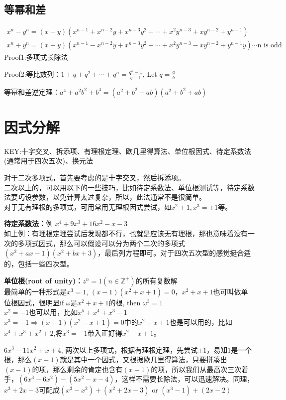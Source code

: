\documentclass[../main.tex]{subfiles}
\begin{document}
\subsection{等幂和差}
\begin{gather*}
  x^n-y^n=(x-y)(x^{n-1}+x^{n-2}y+x^{n-3}y^2+\cdots + x^2y^{n-3}+xy^{n-2}+y^{n-1})\\
  x^n+y^n=(x+y)(x^{n-1}-x^{n-2}y+x^{n-3}y^2-\cdots +x^2y^{n-3}-xy^{n-2}+y^{n-1}y) \cdots \text{n is odd}
\end{gather*}
Proof1:多项式长除法

Proof2:等比数列：$1+q+q^2+\cdots +q^n=\frac{q^{n}-1}{q-1}$, Let $q=\frac{a}{b}$

等幂和差逆定理：$a^4+a^2b^2+b^4=(a^2+b^2-ab)(a^2+b^2+ab)$

\section{因式分解}
KEY:十字交叉、拆添项、有理根定理、欧几里得算法、单位根因式、待定系数法(通常用于四次五次)、换元法

对于二次多项式，首先要考虑的是十字交叉，然后拆添项。\\
二次以上的，可以用以下的一些技巧，比如待定系数法、单位根测试等，待定系数法要巧设参数，以免计算太过复杂，所以，此法通常不是很简单。\\
对于无有理根的多项式，可用常用无理根因式尝试，如$x^2+1, x^3=\pm 1$等。

\textbf{待定系数法：}例 $x^4+9x^3+16x^2-x-3$\\
如上例：有理根定理尝试后发现都不行，也就是应该无有理根，那也意味着没有一次的多项式因式，那么可以假设可以分为两个二次的多项式$(x^2+ax-1)(x^2+bx+3)$，最后列方程即可。对于四次五次型的感觉挺合适的，包括一些四次型。

\textbf{单位根(root of unity)：}$z^n=1(n\in \mathbb{Z^+})$的所有复数解\\
最简单的一种形式是$x^3=1$, $(x-1)(x^2+x+1)=0$，$x^2+x+1$也可叫做单位根因式，很明显if $\omega$是$x^2+x+1$的根, then $\omega^3=1$\\
$x^2=-1$也可以用，比如$x^5+x^4+x^3-1$\\
$x^3=-1 \Rightarrow (x+1)(x^2-x+1)=0$中的$x^2-x+1$也是可以用的，比如$x^4+x^3+x^2+2$,将$x^3=-1$带入正好得$x^2-x+1$。

$6x^3-11x^2+x+4$, 两次以上多项式，根据有理根定理，先尝试$\pm 1$，易知$1$是一个根，那么$(x-1)$就是其中一个因式，又根据欧几里得算法，只要拼凑出$(x-1)$的项，那么剩余的肯定也含有$(x-1)$的项，所以我们从最高次三次着手，$(6x^3-6x^2)-(5x^2-x-4)$，这样不需要长除法，可以迅速解决。同理，$x^3+2x-3$可配成$(x^3-x^2)+(x^2+2x-3)$ or $(x^3-1)+(2x-2)$
\end{document}
